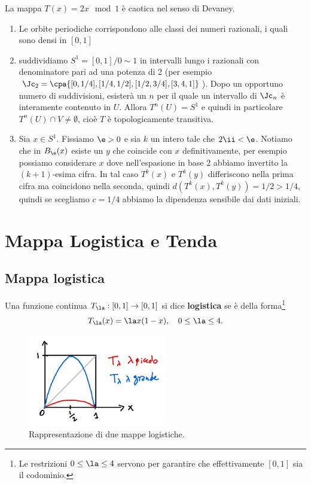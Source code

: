 \begin{example}
La mappa $T(x)=2x\mod 1$ \`e caotica nel senso di Devaney.
\begin{enumerate}
\item Le orbite periodiche corrispondono alle classi dei numeri razionali, i quali sono densi in $[0,1]$
\item suddividiamo $S^1=[0,1]/0\sim 1$ in intervalli lungo i razionali con denominatore pari ad una potenza di 2 (per esempio $\Jc_2=\cpa{[0,1/4], [1/4, 1/2], [1/2, 3/4], [3,4,1]}$). Dopo un opportuno numero di suddivisioni, esister\`a un $n$ per il quale un intervallo di $\Jc_n$ \`e interamente contenuto in $U$. Allora $T^n(U)=S^1$ e quindi in particolare $T^n(U)\cap V\neq \emptyset$, cio\`e $T$ \`e topologicamente transitiva.
\item Sia $x\in S^1$. Fissiamo $\e>0$ e sia $k$ un intero tale che $2\ii<\e$. Notiamo che in $B_\e(x)$ esiste un $y$ che coincide con $x$ definitivamente, per esempio possiamo considerare $x$ dove nell'espasione in base 2 abbiamo invertito la $(k+1)$-esima cifra. In tal caso $T^k(x)$ e $T^k(y)$ differiscono nella prima cifra ma coincidono nella seconda, quindi $d(T^k(x),T^k(y))= 1/2>1/4$, quindi se scegliamo $c=1/4$ abbiamo la dipendenza sensibile dai dati iniziali.
\end{enumerate}
\end{example}


\section{Mappa Logistica e Tenda}
\subsection{Mappa logistica} 
\begin{definition}
Una funzione continua $T_\la:[0,1]\to[0,1]$ si dice \textbf{logistica} se \`e della forma\footnote{Le restrizioni $0\leq \la\leq 4$ servono per garantire che effettivamente $[0,1]$ sia il codominio.}
\[T_\la(x)=\la x(1-x),\quad 0\leq \la\leq 4.\]
\end{definition}

\begin{figure}[!htb]
    \centering
    \includegraphics[width=6cm]{Immagini/Logistica.png}
    \caption{Rappresentazione di due mappe logistiche.}
\end{figure}

